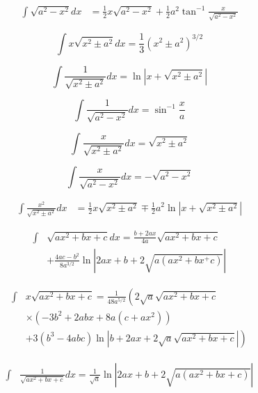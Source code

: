 \documentclass[11pt,twoside]{article}
\begin{document}
\begin{multicols}{3}
\begin{footnotesize}
\begin{align}
\int  \sqrt{a^2 - x^2} dx &= \frac{1}{2} x \sqrt{a^2-x^2} 
+\frac{1}{2}a^2\tan^{-1}\frac{x}{\sqrt{a^2-x^2}}
\end{align}

\begin{equation}
\int  x \sqrt{x^2 \pm a^2} dx= \frac{1}{3}\left ( x^2 \pm a^2 \right)^{3/2} 
\end{equation}

\begin{equation}
\int \frac{1}{\sqrt{x^2 \pm a^2}} dx = \ln \left | x + \sqrt{x^2 \pm a^2} \right | 
\end{equation}

\begin{equation}
\int \frac{1}{\sqrt{a^2 - x^2}} dx = \sin^{-1}\frac{x}{a} 
\end{equation}

\begin{equation}
\int \frac{x}{\sqrt{x^2\pm a^2}}dx = \sqrt{x^2 \pm a^2} 
\end{equation}

\begin{equation}
\int \frac{x}{\sqrt{a^2-x^2}}dx = -\sqrt{a^2-x^2} 
\end{equation}

\begin{align}
\int \frac{x^2}{\sqrt{x^2 \pm a^2}} dx &= \frac{1}{2}x\sqrt{x^2 \pm a^2}
\mp \frac{1}{2}a^2 \ln \left| x + \sqrt{x^2\pm a^2} \right | 
\end{align}

\begin{align}
\int &\sqrt{a x^2 + b x + c} dx = 
\frac{b+2ax}{4a}\sqrt{ax^2+bx+c}
\nonumber \\ &
+
\frac{4ac-b^2}{8a^{3/2}}\ln \left| 2ax + b + 2\sqrt{a(ax^2+bx^+c)}\right |
\end{align}

\begin{align}
\int &x \sqrt{a x^2 + bx + c} = \frac{1}{48a^{5/2}}\left ( 
2 \sqrt{a} \sqrt{ax^2+bx+c}
\right . \nonumber \\ & 
 \times \left( -3b^2 + 2 abx + 8 a(c+ax^2) \right)
 \nonumber \\ & \left.
 + 3(b^3-4abc)\ln \left|b + 2ax + 2\sqrt{a}\sqrt{ax^2+bx+c} \right| \right)
\end{align}

\begin{align}
\int&\frac{1}{\sqrt{ax^2+bx+c}}dx=
\frac{1}{\sqrt{a}}\ln \left| 2ax+b + 2 \sqrt{a(ax^2+bx+c)} \right | 
\end{align}


\end{footnotesize}
\end{multicols}
\end{document}
